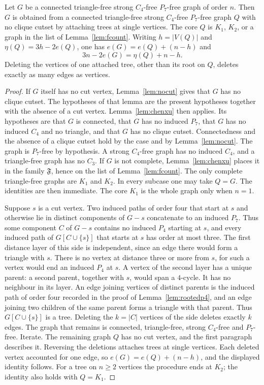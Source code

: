 \documentclass[ASNA]{USG}
\theoremstyle{WBstyletwo}
\numberwithin{equation}{section}
\begin{document}
\begin{lemma}\label{lem:strip}
Let $G$ be a connected triangle-free strong $C_4$-free $P_7$-free graph of order $n$. Then $G$ is obtained from a connected triangle-free strong $C_4$-free $P_7$-free graph $Q$ with no clique cutset by attaching trees at single vertices. The core $Q$ is $K_1$, $K_2$, or a graph in the list of Lemma~\ref{lem:fcount}. Writing $h=|V(Q)|$ and $\eta(Q)=3h-2e(Q)$, one has $e(G)=e(Q)+(n-h)$ and
\[
3n-2e(G)=\eta(Q)+n-h.
\]
Deleting the vertices of one attached tree, other than its root on $Q$, deletes exactly as many edges as vertices.
\end{lemma}

\begin{proof}
If $G$ itself has no cut vertex, Lemma~\ref{lem:nocut} gives that $G$ has no clique cutset. The hypotheses of that lemma are the present hypotheses together with the absence of a cut vertex. Lemma~\ref{lem:chenxu} then applies. Its hypotheses are that $G$ is connected, that $G$ has no induced $P_7$, that $G$ has no induced $C_4$ and no triangle, and that $G$ has no clique cutset. Connectedness and the absence of a clique cutset hold by the case and by Lemma~\ref{lem:nocut}. The graph is $P_7$-free by hypothesis. A strong $C_4$-free graph has no induced $C_4$, and a triangle-free graph has no $C_3$. If $G$ is not complete, Lemma~\ref{lem:chenxu} places it in the family $\mathfrak F$, hence on the list of Lemma~\ref{lem:fcount}. The only complete triangle-free graphs are $K_1$ and $K_2$. In every subcase one may take $Q=G$. The identities are then immediate. The core $K_1$ is the whole graph only when $n=1$.

Suppose $s$ is a cut vertex. Two induced paths of order four that start at $s$ and otherwise lie in distinct components of $G-s$ concatenate to an induced $P_7$. Thus some component $C$ of $G-s$ contains no induced $P_4$ starting at $s$, and every induced path of $G[C\cup\{s\}]$ that starts at $s$ has order at most three. The first distance layer of this side is independent, since an edge there would form a triangle with $s$. There is no vertex at distance three or more from $s$, for such a vertex would end an induced $P_4$ at $s$. A vertex of the second layer has a unique parent: a second parent, together with $s$, would span a $4$-cycle. It has no neighbour in its layer. An edge joining vertices of distinct parents is the induced path of order four recorded in the proof of Lemma~\ref{lem:rootedp4}, and an edge joining two children of the same parent forms a triangle with that parent. Thus $G[C\cup\{s\}]$ is a tree. Deleting the $k=|C|$ vertices of the side deletes exactly $k$ edges. The graph that remains is connected, triangle-free, strong $C_4$-free and $P_7$-free. Iterate. The remaining graph $Q$ has no cut vertex, and the first paragraph describes it. Reversing the deletions attaches trees at single vertices. Each deleted vertex accounted for one edge, so $e(G)=e(Q)+(n-h)$, and the displayed identity follows. For a tree on $n\ge 2$ vertices the procedure ends at $K_2$; the identity also holds with $Q=K_1$.
\end{proof}
\end{document}
